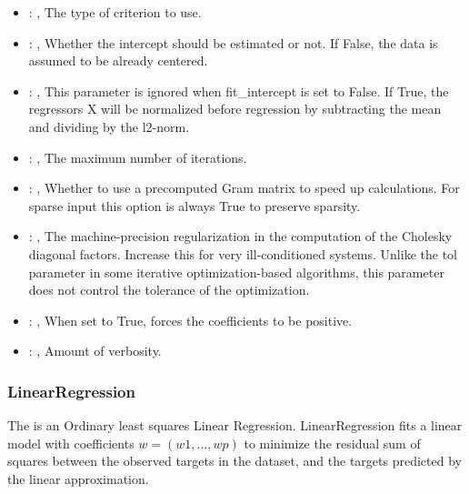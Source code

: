 \begin{itemize}
    \item {}: , 
      The type of criterion to use.

    \item {}: , 
      Whether the intercept should be estimated or not. If False,
      the data is assumed to be already centered.

    \item {}: , 
      This parameter is ignored when fit\_intercept is set to False. If True,
      the regressors X will be normalized before regression by subtracting the mean and
      dividing by the l2-norm.

    \item {}: , 
      The maximum number of iterations.

    \item {}: , 
      Whether to use a precomputed Gram matrix to speed up calculations.
      For sparse input this option is always True to preserve sparsity.

    \item {}: , 
      The machine-precision regularization in the computation of the Cholesky
      diagonal factors. Increase this for very ill-conditioned systems. Unlike the tol
      parameter in some iterative optimization-based algorithms, this parameter does not
      control the tolerance of the optimization.

    \item {}: , 
      When set to True, forces the coefficients to be positive.

    \item {}: , 
      Amount of verbosity.
  \end{itemize}


\subsubsection{LinearRegression}
  The                          is an Ordinary least squares Linear
  Regression.                         LinearRegression fits a linear model with coefficients $w =
  (w1, …, wp)$ to                         minimize the residual sum of squares between the observed
  targets in the                         dataset, and the targets predicted by the linear
  approximation.                         

